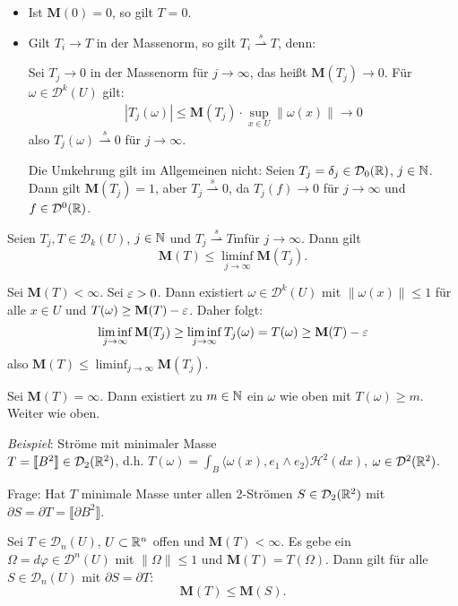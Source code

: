 \documentclass[a4paper,twoside,DIV15,BCOR12mm]{scrbook}
\newcommand{\HM}{\mathscr H}
\newcommand{\MN}{\mathbf M}
\begin{document}
\begin{bemerkung}
\begin{itemize}
\item Ist $\MN(0)=0$, so gilt $T=0$.
\item Gilt $T_i\to T$ in der Massenorm, so gilt $T_i \stackrel{s}{\rightharpoonup} T$, denn:

Sei $T_j\to 0$ in der Massenorm für $j\to\infty$, das heißt $\MN(T_j) \to 0$. Für $\omega\in\mathcal D^k(U)$ gilt:
\begin{align*}
|T_j(\omega)| \le \MN(T_j) \cdot \sup_{x\in U}\|\omega(x)\| \to 0
\end{align*}
also $T_j(\omega) \stackrel{s}{\rightharpoonup} 0$ für $j\to\infty$.

Die Umkehrung gilt im Allgemeinen nicht: Seien $T_j = \delta_j\in\mathcal D_0(\mathbb{R})$, $j\in \mathbb{N}$. Dann gilt $\mathbf{M}(T_j)=1$, aber $T_j \stackrel s\rightharpoonup 0$, da $T_j(f) \to 0$ für $j\to\infty$ und $f\in\mathcal{D}^0(\mathbb{R})$.
\end{itemize}
\end{bemerkung}

\begin{lemma}
\label{lem:4.10}
Seien $T_j, T \in\mathcal D_k(U)$, $j\in\mathbb{N}$ und $T_j \stackrel s\rightharpoonup T$mfür $j\to\infty$. 
Dann gilt
\[
\MN(T) \le \liminf_{j\to\infty} \MN(T_j).
\]
\end{lemma}

\begin{beweis}
Sei $\MN(T)<\infty$. Sei $\varepsilon >0$. Dann existiert $\omega\in\mathcal D^k(U)$ mit $\|\omega(x)\|\le 1$ für alle $x\in U$ und $T(\omega)\ge \MN(T) - \ep$. Daher folgt:
\[
\liminf_{j\to\infty} \MN(T_j) \ge \liminf_{j\to\infty} T_j(\omega) = T(\omega) \ge \MN(T)-\ep
\]
also  $\MN(T) \le \liminf_{j\to\infty} \MN(T_j)$.

Sei $\MN(T)=\infty$. Dann existiert zu $m\in\mathbb{N}$ ein $\omega$ wie oben mit $T(\omega) \ge m$. Weiter wie oben.
\end{beweis}

\emph{Beispiel}: Ströme mit minimaler Masse \\
$T = \llbracket B^2 \rrbracket \in \mathcal D_2 (\mathbb{R}^2)$, d.h. $T(\omega) = \int_B \langle\omega(x),e_1\wedge e_2\rangle \HM^2(dx)$, $\omega \in \mathcal D^2(\mathbb{R}^2)$. 

Frage: Hat $T$ minimale Masse unter allen 2-Strömen $S \in \mathcal D_2(\mathbb{R}^2)$ mit $\partial S = \partial T = \llbracket \partial B^2 \rrbracket$.

\begin{lemma}
Sei $T \in \mathcal D_n(U)$, $U \subset \mathbb{R}^n$ offen und $\MN(T) < \infty$. Es gebe ein $\Omega = d\varphi \in \mathcal D^n(U)$ mit $\|\Omega\|\leq1$ und $\MN(T) = T(\Omega)$. Dann gilt für alle $S\in\mathcal{D}_n(U)$ mit $\partial S = \partial T$:
$$
	\MN(T) \leq \MN(S).
$$
\end{lemma}
\end{document}
